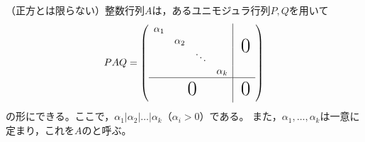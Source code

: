 \documentclass[uplatex]{jsarticle}
\begin{document}
\begin{teiri}
  （正方とは限らない）整数行列$A$は，あるユニモジュラ行列$P,Q$を用いて
  \begin{equation}
    PAQ = \left( \begin{array}{cccc|c}
      \alpha_{1} &            &        &            & \multirow{4}{*}{\BigZero} \\
                 & \alpha_{2} &        &            & \\
                 &            & \ddots &            & \\
                 &            &        & \alpha_{k} & \\ \hline
      \multicolumn{4}{c|}{\BigZero} & \BigZero
    \end{array} \right)
  \end{equation}
  の形にできる。ここで，$\alpha_{1} | \alpha_{2} | \dots | \alpha_{k}$（$\alpha_{i} > 0$）である。
  また，$\alpha_{1}, \dots, \alpha_{k}$は一意に定まり，これを$A$のと呼ぶ。
\end{teiri}
\end{document}
